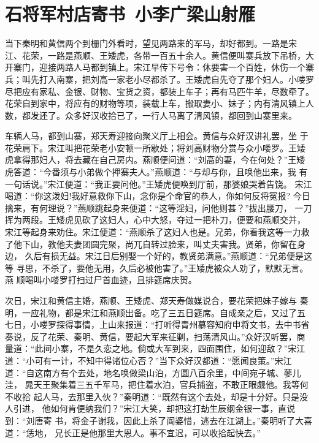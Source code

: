 \chapter{石将军村店寄书~小李广梁山射雁}

当下秦明和黄信两个到栅门外看时，望见两路来的军马，却好都到。一路是宋
江、花荣，一路是燕顺、王矮虎，各带一百五十余人。黄信便叫寨兵放下吊桥，大
开寨门，迎接两路人马都到镇上。宋江早传下号令：休要害一个百姓，休伤一个寨
兵；叫先打入南寨，把刘高一家老小尽都杀了。王矮虎自先夺了那个妇人。小喽罗
尽把应有家私、金银、财物、宝货之资，都装上车子；再有马匹牛羊，尽数牵了。
花荣自到家中，将应有的财物等项，装载上车，搬取妻小、妹子；内有清风镇上人
数，都发还了。众多好汉收拾已了，一行人马离了清风镇，都回到山寨里来。

车辆人马，都到山寨，郑天寿迎接向聚义厅上相会。黄信与众好汉讲礼罢，坐
于花荣肩下。宋江叫把花荣老小安顿一所歇处；将刘高财物分赏与众小喽罗。王矮
虎拿得那妇人，将去藏在自己房内。燕顺便问道：“刘高的妻，今在何处？”王矮
虎答道：“今番须与小弟做个押寨夫人。”燕顺道：“与却与你，且唤他出来，我
有一句话说。”宋江便道：“我正要问他。”王矮虎便唤到厅前，那婆娘哭着告饶。
宋江喝道：“你这泼妇!我好意救你下山，念你是个命官的恭人，你如何反将冤报?
今日擒来，有何理说？”燕顺跳起身来便道：“这等淫妇，问他则甚？”拔出腰刀，
一刀挥为两段。王矮虎见砍了这妇人，心中大怒，夺过一把朴刀，便要和燕顺交并，
宋江等起身来劝住。宋江便道：“燕顺杀了这妇人也是。兄弟，你看我这等一力救
了他下山，教他夫妻团圆完聚，尚兀自转过脸来，叫丈夫害我。贤弟，你留在身边，
久后有损无益。宋江日后别娶一个好的，教贤弟满意。”燕顺道：“兄弟便是这等
寻思，不杀了，要他无用，久后必被他害了。”王矮虎被众人劝了，默默无言。燕
顺喝叫小喽罗打扫过尸首血迹，且排筵席庆贺。

次日，宋江和黄信主婚，燕顺、王矮虎、郑天寿做媒说合，要花荣把妹子嫁与
秦明，一应礼物，都是宋江和燕顺出备。吃了三五日筵席。自成亲之后，又过了五
七日，小喽罗探得事情，上山来报道：“打听得青州慕容知府申将文书，去中书省
奏说，反了花荣、秦明、黄信，要起大军来征剿，扫荡清风山。”众好汉听罢，商
量道：“此间小寨，不是久恋之地。倘或大军到来，四面围住，如何迎敌？”宋江
道：“小可有一计，不知中得诸位心否？”当下众好汉都道：“愿闻良策。”宋江
道：“自这南方有个去处，地名唤做梁山泊，方圆八百余里，中间宛子城、蓼儿洼，
晁天王聚集着三五千军马，把住着水泊，官兵捕盗，不敢正眼觑他。我等何不收拾
起人马，去那里入伙？”秦明道：“既然有这个去处，却是十分好。只是没人引进，
他如何肯便纳我们？”宋江大笑，却把这打劫生辰纲金银一事，直说到：“刘唐寄
书，将金子谢我，因此上杀了阎婆惜，逃去在江湖上。”秦明听了大喜道：“恁地，
兄长正是他那里大恩人。事不宜迟，可以收拾起快去。”

